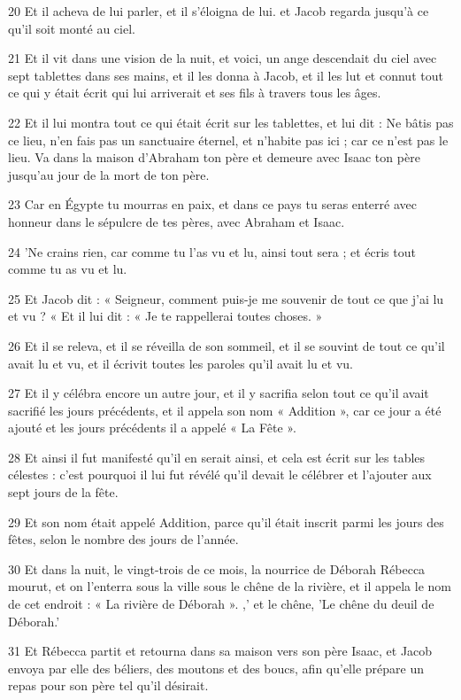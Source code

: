 \par 20 Et il acheva de lui parler, et il s'éloigna de lui. et Jacob regarda jusqu'à ce qu'il soit monté au ciel.
\par 21 Et il vit dans une vision de la nuit, et voici, un ange descendait du ciel avec sept tablettes dans ses mains, et il les donna à Jacob, et il les lut et connut tout ce qui y était écrit qui lui arriverait et ses fils à travers tous les âges.
\par 22 Et il lui montra tout ce qui était écrit sur les tablettes, et lui dit : Ne bâtis pas ce lieu, n'en fais pas un sanctuaire éternel, et n'habite pas ici ; car ce n'est pas le lieu. Va dans la maison d'Abraham ton père et demeure avec Isaac ton père jusqu'au jour de la mort de ton père.
\par 23 Car en Égypte tu mourras en paix, et dans ce pays tu seras enterré avec honneur dans le sépulcre de tes pères, avec Abraham et Isaac.
\par 24 'Ne crains rien, car comme tu l'as vu et lu, ainsi tout sera ; et écris tout comme tu as vu et lu.
\par 25 Et Jacob dit : « Seigneur, comment puis-je me souvenir de tout ce que j'ai lu et vu ? « Et il lui dit : « Je te rappellerai toutes choses. »
\par 26 Et il se releva, et il se réveilla de son sommeil, et il se souvint de tout ce qu'il avait lu et vu, et il écrivit toutes les paroles qu'il avait lu et vu.
\par 27 Et il y célébra encore un autre jour, et il y sacrifia selon tout ce qu'il avait sacrifié les jours précédents, et il appela son nom « Addition », car ce jour a été ajouté et les jours précédents il a appelé « La Fête ».
\par 28 Et ainsi il fut manifesté qu'il en serait ainsi, et cela est écrit sur les tables célestes : c'est pourquoi il lui fut révélé qu'il devait le célébrer et l'ajouter aux sept jours de la fête.
\par 29 Et son nom était appelé Addition, parce qu'il était inscrit parmi les jours des fêtes, selon le nombre des jours de l'année.
\par 30 Et dans la nuit, le vingt-trois de ce mois, la nourrice de Déborah Rébecca mourut, et on l'enterra sous la ville sous le chêne de la rivière, et il appela le nom de cet endroit : « La rivière de Déborah ». ,' et le chêne, 'Le chêne du deuil de Déborah.'
\par 31 Et Rébecca partit et retourna dans sa maison vers son père Isaac, et Jacob envoya par elle des béliers, des moutons et des boucs, afin qu'elle prépare un repas pour son père tel qu'il désirait.
